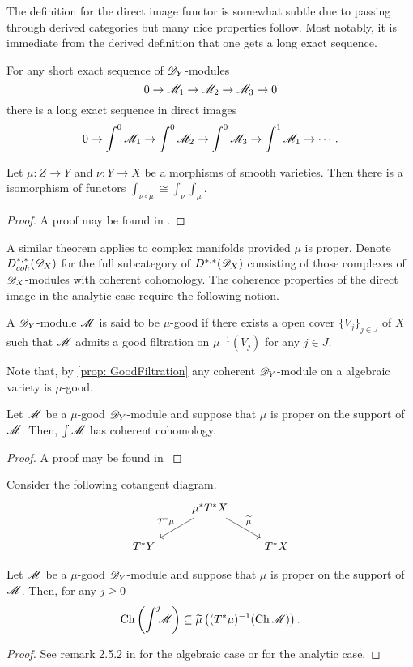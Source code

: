 The definition for the direct image functor is somewhat subtle due to passing through derived categories but many nice properties follow.
Most notably, it is immediate from the derived definition that one gets a long exact sequence.
\begin{proposition}
    For any short exact sequence of $\mathscr{D}_Y$-modules
    $$0 \to \mathscr{M}_1 \to \mathscr{M}_2 \to \mathscr{M}_3 \to 0 $$
    there is a long exact sequence in direct images
    $$0 \to \int^0\mathscr{M}_1 \to \int^0 \mathscr{M}_2 \to \int^0 \mathscr{M}_3 \to \int^1 \mathscr{M}_1 \to \cdots.$$
\end{proposition}
\begin{proposition}
  Let $\mu:Z\to Y$ and $\nu:Y\to X$ be a morphisms of smooth varieties. Then there is a isomorphism of functors $\int_{\nu\circ \mu} \cong \int_\nu \int_\mu$.
\end{proposition}
\begin{proof}
  A proof may be found in \cite[Chapter 6]{borel1987algebraic}.
\end{proof}
A similar theorem applies to complex manifolds provided $\mu$ is proper.
Denote $D_{coh}^{*,*}(\mathscr{D}_X)$ for the full subcategory of $D^{*,*}(\mathscr{D}_X)$ consisting of those complexes of $\mathscr{D}_X$-modules with coherent cohomology.
The coherence properties of the direct image in the analytic case require the following notion.
\begin{definition}
  A $\mathscr{D}_Y$-module $\mathscr{M}$ is said to be $\mu$-good if there exists a open cover $\{V_j\}_{j\in J}$ of $X$ such that $\mathscr{M}$ admits a good filtration on $\mu^{-1}(V_j)$ for any $j\in J$.
\end{definition}
Note that, by \cref{prop: GoodFiltration} any coherent $\mathscr{D}_Y$-module on a algebraic variety is $\mu$-good.
\begin{theorem}
  Let $\mathscr{M}$ be a $\mu$-good $\mathscr{D}_Y$-module and suppose that $\mu$ is proper on the support of $\mathscr{M}$.
  Then, $\int \mathscr{M}$ has coherent cohomology.
\end{theorem}
\begin{proof}
  A proof may be found in \cite[Chapter 3]{sabbah2011introduction}
\end{proof}
Consider the following cotangent diagram.
$$
\begin{tikzcd}
    & \mu^* T^* X\arrow[swap]{ld}{T^* \mu} \arrow{rd}{\widetilde{\mu}} & \\
    T^* Y & & T^*X
\end{tikzcd}
$$
\begin{proposition}\label{prop: EstimateProper}
  Let $\mathscr{M}$ be a $\mu$-good $\mathscr{D}_Y$-module and suppose that $\mu$ is proper on the support of $\mathscr{M}$. Then, for any $j\geq 0$
  $$\operatorname{Ch}\left(\int^j \mkern -8mu \mathscr{M} \right)\subseteq  \widetilde{\mu}\left((T^*\mu)^{-1}(\operatorname{Ch} \mathscr{M}) \right).$$
\end{proposition}
\begin{proof}
  See remark 2.5.2 in \cite[Chapter 2]{hotta2007d} for the algebraic case or \cite[Chapter 3]{sabbah2011introduction} for the analytic case.
\end{proof}
